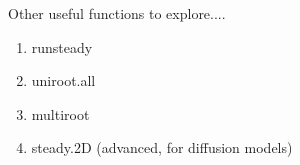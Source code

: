 \documentclass{eecslides}
\begin{document}

	\begin{frame}{Other useful functions to explore....}

		\begin{enumerate}
			\item runsteady
			\item uniroot.all
			\item multiroot
			\item steady.2D (advanced, for diffusion models)
		\end{enumerate}
	\end{frame}

\end{document}
